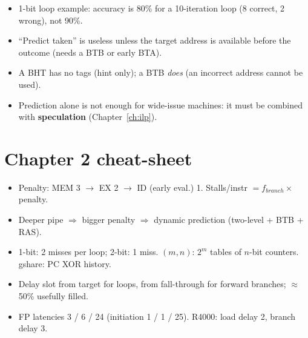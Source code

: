 \begin{trap}
\begin{itemize}
\item 1-bit loop example: accuracy is 80\% for a 10-iteration loop (8 correct, 2 wrong), not 90\%.
\item ``Predict taken'' is useless unless the target address is available before the outcome (needs a BTB or early BTA).
\item A BHT has no tags (hint only); a BTB \emph{does} (an incorrect address cannot be used).
\item Prediction alone is not enough for wide-issue machines: it must be combined with \textbf{speculation} (Chapter~\ref{ch:ilp}).
\end{itemize}
\end{trap}

\section{Chapter 2 cheat-sheet}
\begin{key}
\begin{itemize}
\item Penalty: MEM 3 $\rightarrow$ EX 2 $\rightarrow$ ID (early eval.) 1. Stalls/instr $=f_{branch}\times$ penalty.
\item Deeper pipe $\Rightarrow$ bigger penalty $\Rightarrow$ dynamic prediction (two-level + BTB + RAS).
\item 1-bit: 2 misses per loop; 2-bit: 1 miss. $(m,n)$: $2^m$ tables of $n$-bit counters. gshare: PC XOR history.
\item Delay slot from target for loops, from fall-through for forward branches; $\approx$50\% usefully filled.
\item FP latencies 3 / 6 / 24 (initiation 1 / 1 / 25). R4000: load delay 2, branch delay 3.
\end{itemize}
\end{key}
